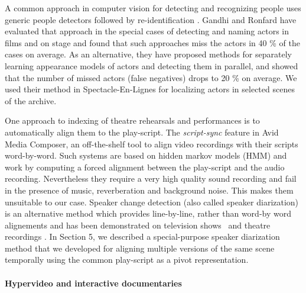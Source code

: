 \documentclass[conference]{IEEEtran}
\begin{document}
A common approach in computer vision for detecting and recognizing people uses generic people detectors \cite{Ronfard02,
Dalal05,Felzenszwalb10,Andriluka12} followed by re-identification \cite{TapaswiBS12}. Gandhi and Ronfard have evaluated 
that approach in the special cases of detecting and naming actors in films and on stage \cite{Gandhi13} and found that such 
approaches miss the actors in 40 \% of the cases on average. As an alternative, they have proposed
methods for separately learning appearance models of actors and detecting them in parallel, and showed that the number
of missed actors (false negatives) drops to 20 \% on average. We used their method in Spectacle-En-Lignes for localizing
actors in selected scenes of the archive.

One approach to indexing of theatre rehearsals and performances is to automatically align
them to the play-script. The {\em script-sync} feature in Avid Media Composer,
an off-the-shelf tool to align video recordings with their scripts word-by-word. Such systems
are based on hidden markov models (HMM) and work by computing  a forced alignment 
between the play-script and the audio recording. Nevertheless they require a very high quality 
sound recording and fail in the presence of music, reverberation and background noise. This makes them
unsuitable to our case. Speaker change detection (also called speaker diarization) is an alternative method
which provides line-by-line, rather than word-by word alignements and has been demonstrated 
on television shows~\cite{Sankar09} and theatre recordings \cite{Caillet07,Caillet13}. In Section 5,
we described a special-purpose  speaker diarization method  that we developed  for aligning multiple versions 
of the same scene temporally using the common play-script as a pivot representation.


\paragraph*{Hypervideo and interactive documentaries}
\end{document}
